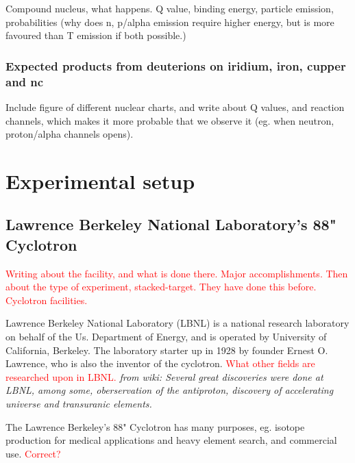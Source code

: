 \documentclass[a4paper,11pt,twoside]{book}
\begin{document}
Compound nucleus, what happens. 
Q value, binding energy, particle emission, probabilities (why does n, p/alpha emission require higher energy, but is more favoured than T emission if both possible.)


\subsection{Expected products from deuterions on iridium, iron, cupper and nc}

Include figure of different nuclear charts, and write about Q values, and reaction channels, which makes it more probable that we observe it (eg. when neutron, proton/alpha channels opens).





\chapter{Experimental setup} \label{Experiment}




\section{Lawrence Berkeley National Laboratory's 88" Cyclotron} \label{sec:Cyclotron}
\noindent

\textcolor{red}{Writing about the facility, and what is done there. Major accomplishments. Then about the type of experiment, stacked-target. They have done this before. Cyclotron facilities. }

Lawrence Berkeley National Laboratory (LBNL) is a national research laboratory on behalf of the Us. Department of Energy, and is operated by University of California, Berkeley. The laboratory starter up in 1928 by founder Ernest O. Lawrence, who is also the inventor of the cyclotron. \textcolor{red}{What other fields are researched upon in LBNL.} \textit{from wiki: Several great discoveries were done at LBNL, among some, oberservation of the antiproton, discovery of accelerating universe and transuranic elements. }

\noindent
The Lawrence Berkeley's 88" Cyclotron has many purposes, eg. isotope production for medical applications and heavy element search, and commercial use.  \textcolor{red}{Correct?} \\
\end{document}
